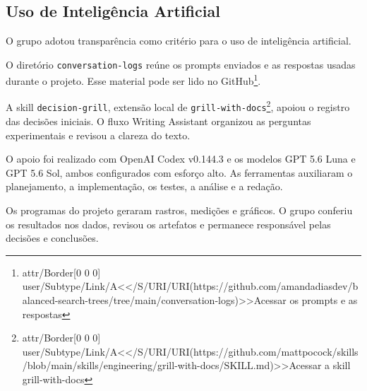 \documentclass[12pt]{article}
\newcommand{\externallink}[2]{{\color{blue}\leavevmode
\pdfstartlink attr{/Border[0 0 0]} user{/Subtype/Link/A<</S/URI/URI(#2)>>}#1\pdfendlink}}
\begin{document}
\subsection{Uso de Inteligência Artificial}\label{sec:conclusion:ai}

{O grupo adotou transparência como critério para o uso de inteligência artificial.}

{O diretório \texttt{conversation-logs} reúne os prompts enviados e as respostas usadas durante o projeto. Esse material pode ser lido no GitHub\footnote{\externallink{Acessar os prompts e as respostas}{https://github.com/amandadiasdev/balanced-search-trees/tree/main/conversation-logs}}.}

{A skill \texttt{decision-grill}, extensão local de \texttt{grill-with-docs}\footnote{\externallink{Acessar a skill grill-with-docs}{https://github.com/mattpocock/skills/blob/main/skills/engineering/grill-with-docs/SKILL.md}}, apoiou o registro das decisões iniciais. O fluxo Writing Assistant organizou as perguntas experimentais e revisou a clareza do texto.}

{O apoio foi realizado com OpenAI Codex v0.144.3 e os modelos GPT 5.6 Luna e GPT 5.6 Sol, ambos configurados com esforço alto. As ferramentas auxiliaram o planejamento, a implementação, os testes, a análise e a redação.}

{Os programas do projeto geraram rastros, medições e gráficos. O grupo conferiu os resultados nos dados, revisou os artefatos e permanece responsável pelas decisões e conclusões.}
\end{document}

